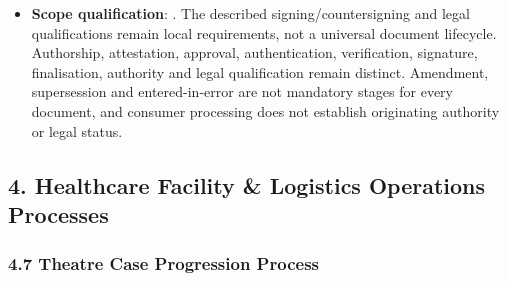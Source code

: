 \begin{itemize}
\begin{itemize}
\end{itemize}


\item
\textbf{Scope qualification}: \texttt{}. The described signing/\allowbreak{}countersigning and legal qualifications remain local requirements, not a universal document lifecycle. Authorship, attestation, approval, authentication, verification, signature, finalisation, authority and legal qualification remain distinct. Amendment, supersession and entered-in-error are not mandatory stages for every document, and consumer processing does not establish originating authority or legal status.



\end{itemize}
\label{rad:processes:166}

\par\smallskip
{}\label{rad:processes:168}
\subsection*{4. Healthcare Facility \& Logistics Operations Processes}
\label{rad:processes:170}
\subsubsection*{4.7 Theatre Case Progression Process}
\label{rad:processes:171}

